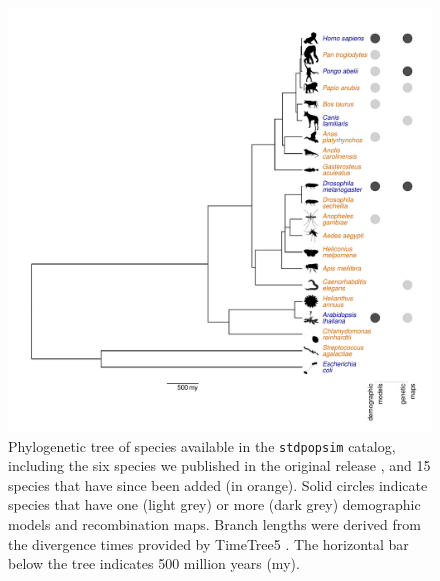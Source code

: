 \documentclass[hidelinks]{article}
\newcommand{\stdpopsim}{\texttt{stdpopsim}\xspace}
\begin{document}
\begin{figure}
    \includegraphics[width=\linewidth]{figs/species_fig}
	\caption{Phylogenetic tree of species available in the \stdpopsim catalog,
		including the six species we published in the original release \citep[in blue]{Adrion2020}, and 15 species that have since been added (in orange).
		Solid circles indicate species that have one (light grey) or more
		(dark grey) demographic models and recombination maps.
		Branch lengths were derived from the divergence times provided by TimeTree5 \citep{Kumar2022}.
		The horizontal bar below the tree indicates 500 million years (my).
	\label{fig:tree} }
\end{figure}
\end{document}

